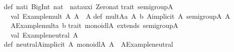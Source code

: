 \begin{isabellebody}
\begin{isamarkuptext}
\isanewline
def\ nat{}i{}\ BigInt{}{}\ nat\ {}\ nat{}aux{}i{}\ Zero{}nat{}\isanewline
\isanewline
trait\ semigroup{}A{}\ {}\isanewline
\ \ val\ {}Example{}mult{}{}\ {}A{}\ A{}\ {}{}\ A\isanewline
{}\isanewline
def\ mult{}A{}{}a{}\ A{}\ b{}\ A{}{}implicit\ A{}\ semigroup{}A{}{}{}\ A\ {}\isanewline
\ \ A{}{}Example{}mult{}{}a{}\ b{}\isanewline
\isanewline
trait\ monoidl{}A{}\ extends\ semigroup{}A{}\ {}\isanewline
\ \ val\ {}Example{}neutral{}{}\ A\isanewline
{}\isanewline
def\ neutral{}A{}{}implicit\ A{}\ monoidl{}A{}{}{}\ A\ {}\ A{}{}Example{}neutral{}\isanewline

\end{isamarkuptext}
\end{isabellebody}
